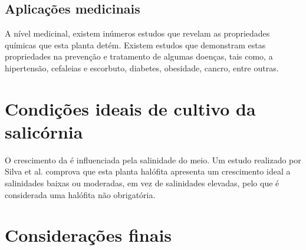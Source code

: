 

\subsection{Aplicações medicinais}


A nível medicinal, existem inúmeros estudos que revelam as propriedades químicas que esta planta detém. Existem estudos que demonstram estas propriedades na prevenção e tratamento de algumas doenças, tais como, a hipertensão, cefaleias e escorbuto, diabetes, obesidade, cancro, entre outras.


\section{Condições ideais de cultivo da salicórnia}

O crescimento da \sr é influenciada pela salinidade do meio. Um estudo realizado por Silva et al.\cite{Silva2007} comprova que esta planta halófita apresenta um crescimento ideal a salinidades baixas ou moderadas, em vez de salinidades elevadas, pelo que é considerada uma halófita não obrigatória.






\section{Considerações finais}






